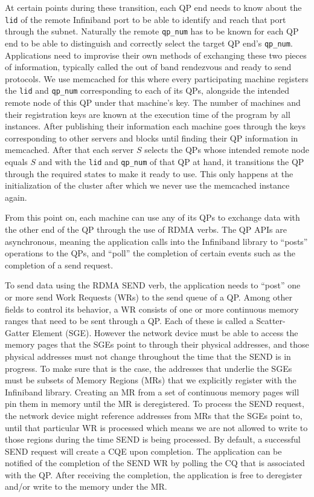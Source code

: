 At certain points during these transition, each
QP end needs to know about the \texttt{lid} of the remote Infiniband port to
be able to identify and reach that port through the subnet. Naturally the
remote \texttt{qp\_num} has to be known for each QP end to be able to
distinguish and correctly select the target QP end's \texttt{qp\_num}.
Applications need to improvise their own methods of exchanging these two
pieces of information, typically called the out of band rendezvous and ready to
send protocols. We use memcached for this where every participating machine
registers the \texttt{lid} and \texttt{qp\_num} corresponding to each of its
QPs, alongside the intended remote node of this QP under that machine's key.
The number of machines and their registration keys
are known at the execution time of the program by all instances. After
publishing their information each machine goes through the keys corresponding
to other servers and blocks until finding their QP information in memcached.
After that each server $S$ selects the QPs whose intended remote node equals
$S$ and with the \texttt{lid} and \texttt{qp\_num} of that QP at hand, it
transitions the QP through the required states to make it ready to use. This
only happens at the initialization of the cluster after which we never use
the memcached instance again.

From this point on, each machine can use any of its QPs to exchange data with
the other end of the QP through the use of RDMA verbs. The QP APIs are
asynchronous, meaning the application calls into the Infiniband library to
``posts'' operations to the QPs, and ``poll'' the completion of certain events
such as the completion of a send request.

To send data using the RDMA SEND verb, the application needs to ``post'' one
or more send Work Requests (WRs) to the send queue of a QP. Among other fields
to control its behavior, a WR consists of one or more
continuous memory ranges that need to be sent through a QP. Each of these
is called a Scatter-Gatter Element (SGE). However the network device must be
able to access the memory pages that the SGEs point to through their physical
addresses, and those physical addresses must not change throughout the time
that the SEND is in progress. To make sure that is the case, the addresses
that underlie the SGEs must be subsets of Memory Regions (MRs) that we
explicitly register with the Infiniband library. Creating an MR from a set of
continuous memory pages will pin them in memory until the MR is
deregistered. To process the SEND request, the network device might reference
addresses from MRs that the SGEs point to, until that particular WR is
processed which means we are not allowed to write to those regions during
the time SEND is being processed. By default, a successful SEND request will
create a CQE upon completion. The application can be notified of the completion
of the SEND WR by polling the CQ that is associated with the QP. After receiving
the completion, the application is free to deregister and/or write to the
memory under the MR.

